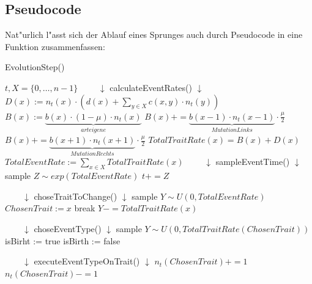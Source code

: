 \documentclass[11pt, a4paper, german]{article}
\begin{document}
	\subsection{Pseudocode}
	Nat"urlich l"asst sich der Ablauf eines Sprunges auch durch Pseudocode in eine Funktion zusammenfassen:
	
	\begin{algorithm}[H]
		\caption{EvolutionStep()}
		\begin{algorithmic}[1]
			\REQUIRE $ t, X = \{0,\dots, n-1\} $
			\STATE $ \qquad \downarrow $ \textcolor[rgb]{0,0,0.55}{calculateEventRates}() $ \downarrow $
				\STATE $  D(x) := n_t(x) \cdot \left( d(x) + \sum_{y \in X} c(x,y) \cdot n_t(y) \right) $
				\STATE $ B(x) := \underbrace{b(x) \cdot (1 - \mu) \cdot n_t(x)}_{arteigene}  $
					\STATE $ B(x) += \underbrace{b(x-1)\cdot n_t(x-1)}_{Mutation Links} \cdot \frac{\mu}{2} $
				\ENDIF
					\STATE $ B(x) += \underbrace{b(x+1)\cdot n_t(x+1)}_{Mutation Rechts} \cdot \frac{\mu}{2} $
				\ENDIF
				\STATE $ TotalTraitRate(x) = B(x) + D(x) $
			\ENDFOR
			\STATE $ TotalEventRate := \sum_{x \in X} TotalTraitRate(x) $
			\STATE $ \qquad \downarrow $ \textcolor[rgb]{0,0,0.55}{sampleEventTime}() $ \downarrow $
			\STATE sample $ Z \sim exp(TotalEventRate) $
			\STATE $ t += Z $
			
			\STATE $ \qquad \downarrow $ \textcolor[rgb]{0,0,0.55}{choseTraitToChange}() $ \downarrow $
			\STATE sample $ Y \sim U(0,TotalEventRate) $
					\STATE $ ChosenTrait := x $
					\STATE break
				\ENDIF
				\STATE $ Y -= TotalTraitRate(x) $
			\ENDFOR
			
			\STATE $ \qquad \downarrow $ \textcolor[rgb]{0,0,0.55}{choseEventType()} $ \downarrow $
			\STATE sample $ Y \sim U(0,TotalTraitRate(ChosenTrait)) $
				\STATE isBirht := true
			\ELSE
				\STATE isBirth := false
			\ENDIF
			
			\STATE $ \qquad \downarrow $ \textcolor[rgb]{0,0,0.55}{executeEventTypeOnTrait()} $ \downarrow $
				\STATE $ n_t(ChosenTrait) += 1 $
			\ELSE
					\STATE $ n_t(ChosenTrait) -= 1 $
				\ENDIF
			\ENDIF
		\end{algorithmic}
	\end{algorithm}
	
\end{document}

